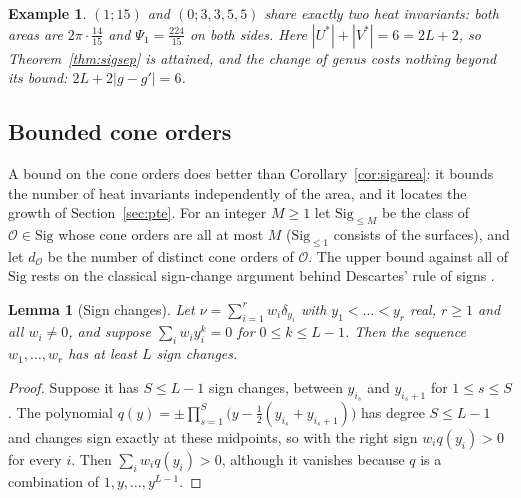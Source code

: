 \documentclass[pdflatex,sn-mathphys-num]{sn-jnl}
\theoremstyle{thmstyleone}%
\newtheorem{lemma}[theorem]{Lemma}%
\theoremstyle{thmstylethree}%
\newtheorem{example}[theorem]{Example}%
\newcommand{\Orb}{\mathcal{O}}
\newcommand{\Sig}{\mathrm{Sig}}
\begin{document}
\begin{example}\label{ex:siggenus}
$(1;15)$ and $(0;3,3,5,5)$ share exactly two heat invariants: both areas are $2\pi\cdot\frac{14}{15}$ and $\Psi_1=\frac{224}{15}$ on both sides. Here $|U^*|+|V^*|=6=2L+2$, so Theorem~\ref{thm:sigsep} is attained, and the change of genus costs nothing beyond its bound: $2L+2|g-g'|=6$.
\end{example}

\subsection{Bounded cone orders}\label{sec:bounded}

A bound on the cone orders does better than Corollary~\ref{cor:sigarea}: it bounds the number of heat invariants independently of the area, and it locates the growth of Section~\ref{sec:pte}. For an integer $M\ge1$ let $\Sig_{\le M}$ be the class of $\Orb\in\Sig$ whose cone orders are all at most $M$ ($\Sig_{\le1}$ consists of the surfaces), and let $d_\Orb$ be the number of distinct cone orders of $\Orb$. The upper bound against all of $\Sig$ rests on the classical sign-change argument behind Descartes' rule of signs \cite[Lemma~3.2, Cor.~3.3]{laurens2023}.

\begin{lemma}[Sign changes]\label{lem:signs}
Let $\nu=\sum_{i=1}^rw_i\delta_{y_i}$ with $y_1<\dots<y_r$ real, $r\ge1$ and all $w_i\ne0$, and suppose $\sum_iw_iy_i^k=0$ for $0\le k\le L-1$. Then the sequence $w_1,\dots,w_r$ has at least $L$ sign changes.
\end{lemma}

\begin{proof}
Suppose it has $S\le L-1$ sign changes, between $y_{i_s}$ and $y_{i_s+1}$ for $1\le s\le S$. The polynomial $q(y)=\pm\prod_{s=1}^S\big(y-\frac12(y_{i_s}+y_{i_s+1})\big)$ has degree $S\le L-1$ and changes sign exactly at these midpoints, so with the right sign $w_iq(y_i)>0$ for every $i$. Then $\sum_iw_iq(y_i)>0$, although it vanishes because $q$ is a combination of $1,y,\dots,y^{L-1}$.
\end{proof}
\end{document}
